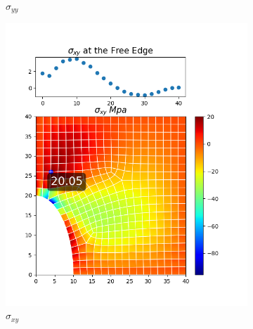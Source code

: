 \documentclass[twoside,twocolumn,10pt]{article}
\begin{document}
\begin{figure}[!ht]
\begin{subfigure}[c]{0.26\textwidth}
    \caption{$\sigma_{yy}$}
    \label{fig:y_quad_0.5}
  \end{subfigure}%
  \hfill
  \begin{subfigure}[c]{0.26\textwidth}
    \includegraphics[width=1.\linewidth]{Q2_5/Q5_0.5_xy_quad.png}
    \caption{$\sigma_{xy}$}
    \label{fig:xy_quad_0.5}
  \end{subfigure}%
  \begin{subfigure}[c]{0.26\textwidth}

\end{subfigure}
\end{figure}
\end{document}
